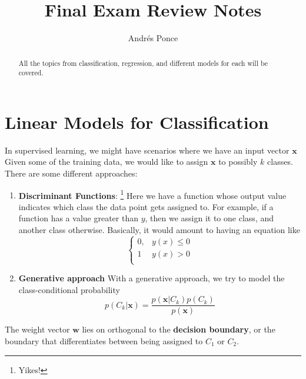 \documentclass{tufte-handout}
\title{Final Exam Review Notes}
\author{Andr\'es Ponce}
\renewcommand{\vec}[1]{\mathbf{#1}}
\begin{document}
\maketitle

\begin{abstract}
	All the topics from classification, regression, and different models for 
	each will be covered.

\end{abstract}
\section{Linear Models for Classification}
In supervised learning, we might have scenarios where we have an input vector $\vec{x}$
Given some of the training data, we would like to assign $\vec{x}$ to possibly $k$ classes.
There are some different approaches:
\begin{enumerate}
	\item \textbf{Discriminant Functions}:
			\footnote{Yikes!}
			Here we have a function whose output value indicates which class the data point gets assigned to.
			For example, if a function has a value greater than $y$, then we assign it to one class, and 
				another class otherwise.
			Basically, it would amount to having an equation like
			\[ \begin{cases}
					0, & y(x) \leq 0 \\
					1 & y(x) > 0 \\
				\end{cases}
			\]
	\item \textbf{Generative approach}
			With a generative approach, we try to model the class-conditional probability
			\[p(C_{k}|\vec{x}) = \frac{p(\vec{x}|C_{k})p(C_{k})}{p(\vec{x})}\]
\end{enumerate}

The weight vector $\vec{w}$ lies on orthogonal to the \textbf{decision boundary}, or the boundary that 
	differentiates between being assigned to $C_{1}$ or $C_{2}$.
\end{document}
